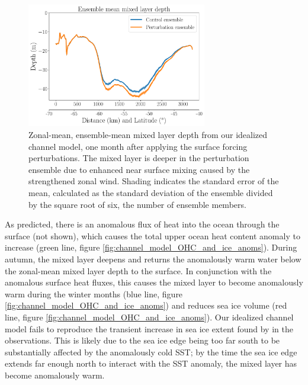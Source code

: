 \documentclass{ametsocV5}
\begin{document}
\begin{figure}[!ht]
	\begin{center}
		\includegraphics[width=0.7\textwidth]{figures/channel_model_mld_anoms.pdf}
		\caption{Zonal-mean, ensemble-mean mixed layer depth from our idealized channel model, one month after applying the surface forcing perturbations. The mixed layer is deeper in the perturbation ensemble due to enhanced near surface mixing caused by the strengthened zonal wind. Shading indicates the standard error of the mean, calculated as the standard deviation of the ensemble divided by the square root of six, the number of ensemble members.}
		\label{fig:channel_model_mld_anoms}
	\end{center}
\end{figure}


As predicted, there is an anomalous flux of heat into the ocean through the surface (not shown), which causes the total upper ocean heat content anomaly to increase (green line, figure \ref{fig:channel_model_OHC_and_ice_anoms}). During autumn, the mixed layer deepens and returns the anomalously warm water below the zonal-mean mixed layer depth to the surface. In conjunction with the anomalous surface heat fluxes, this causes the mixed layer to become anomalously warm during the winter months (blue line, figure \ref{fig:channel_model_OHC_and_ice_anoms}) and reduces sea ice volume (red line, figure \ref{fig:channel_model_OHC_and_ice_anoms}). Our idealized channel model fails to reproduce the transient increase in sea ice extent found by \citet{Doddridge2017} in the observations. This is likely due to the sea ice edge being too far south to be substantially affected by the anomalously cold SST; by the time the sea ice edge extends far enough north to interact with the SST anomaly, the mixed layer has become anomalously warm.
\end{document}
